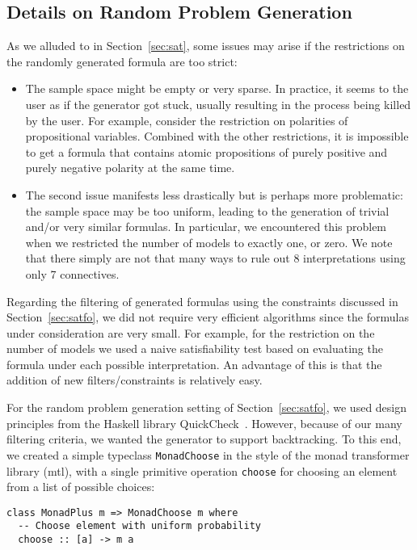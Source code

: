 \subsection{Details on Random Problem Generation}\label{appB:SAT}

As we alluded to in Section~\ref{sec:sat},
some issues may arise if the restrictions on the randomly generated formula are too strict:
\begin{itemize}
    \item
        The sample space might be empty or very sparse.
        In practice, it seems to the user as if the generator got stuck,
        usually resulting in the process being killed by the user. 
        For example,
        consider the restriction on polarities of propositional
        variables. %
        Combined with the other restrictions,
        it is impossible to get a formula that contains atomic propositions
        of purely positive and purely negative polarity at the same time.

    \item
        The second issue manifests less drastically but is perhaps more problematic:
        the sample space may be too uniform,
        leading to the generation of trivial and/or very similar
        formulas. 
        In particular, we encountered this problem
        when we restricted the number of models to exactly one, or zero.
        We note that there simply are not that many ways to rule out 8 interpretations
        using only 7 connectives.
\end{itemize}





Regarding the filtering of generated formulas using the constraints discussed in Section~\ref{sec:satfo},
we did not require very efficient algorithms since
the formulas under consideration are very small.
For example, for the restriction on the number of models we used a naive satisfiability test
based on evaluating the formula under each possible interpretation.
An advantage of this is that the addition of new filters/constraints is relatively easy.




For the random problem generation setting of Section~\ref{sec:satfo},
we used design principles from the Haskell library
QuickCheck~\cite{ClaessenHughes:2000:QuickCheck}.
However, because of our many filtering criteria, we wanted the generator to support backtracking.
To this end,
we created a simple typeclass \texttt{MonadChoose} in the style of the monad transformer library (mtl),
with a single primitive operation \texttt{choose} for choosing an element from a list of possible choices:
\begin{lstlisting}
class MonadPlus m => MonadChoose m where
  -- Choose element with uniform probability
  choose :: [a] -> m a
\end{lstlisting}

